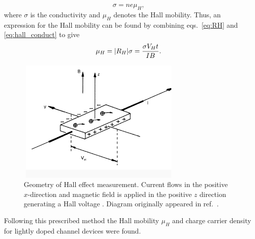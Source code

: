 \begin{equation}\label{eq:hall_conduct}
	\sigma = n e \mu_H,
\end{equation}
where $\sigma$ is the conductivity and $\mu_H$ denotes the Hall mobility. Thus, an expression for the Hall mobility can be found by combining eqs.~\ref{eq:RH} and \ref{eq:hall_conduct} to give
\begin{equation}\label{eq:mu_H}
	\mu_H = \abs{R_H}\sigma = \frac{\sigma V_H t}{I B}.
\end{equation}
\begin{figure}[ht]
	\centering
	\includegraphics[height=6cm,width=8cm]{figs/results/hall_diagram}
	\caption[Hall effect measurement diagram]{Geometry of Hall effect measurement. Current flows in the positive $x$-direction and magnetic field is applied in the positive $z$ direction generating a Hall voltage \cite{HallEffectNIST}. Diagram originally appeared in ref.~\cite{HallDiagram}.}
	\label{fig:hall_diagram}
\end{figure}
Following this prescribed method the Hall mobility $\mu_H$ and charge carrier density for lightly doped channel  devices were found. \\ \\

